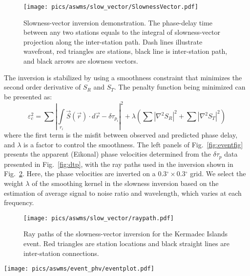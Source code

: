 \begin{figure}
	\center
	\texttt{[image: pics/aswms/slow\_vector/SlownessVector.pdf]}
	\caption[Relative phase delays against the epicentral distance differences]{Slowness-vector inversion demonstration. The phase-delay time between any two stations equals to the integral of slowness-vector projection along the inter-station path. Dash lines illustrate wavefront, red triangles are stations, black line is inter-station path, and black arrows are slowness vectors.}
	\label{fig:slowvector}
\end{figure}

The inversion is stabilized by using a smoothness constraint that minimizes the second order derivative of $S_R$ and $S_T$. The penalty function being minimized can be presented as:
\begin{equation}
	\varepsilon_{c}^2 = \sum \left| \int\limits_{r_i} \vec{S}(\vec{r}) \cdot d\vec{r} - \delta \tau_{p_i}\right|^2 + \lambda \left( \sum |\nabla^2 S_R|^2 + \sum |\nabla^2 S_T|^2 \right)
\end{equation}
where the first term is the misfit between observed and predicted phase delay, and $\lambda$ is a factor to control the smoothness. The left panels of Fig.~\ref{fig:eventfig} presents the apparent (Eikonal) phase velocities determined from the $\delta \tau_p$ data presented in Fig.~\ref{fig:dtp}, with the ray paths used in the inversion shown in Fig.~\ref{fig:raypath}.    
Here, the phase velocities are inverted on a 0.3$^\circ \times$0.3$^\circ$ grid. We select the weight $\lambda$ of the smoothing kernel in the slowness inversion based on the estimation of average signal to noise ratio and wavelength, which varies at each frequency.

\begin{figure}
	\center
	\texttt{[image: pics/aswms/slow\_vector/raypath.pdf]}
	\caption[Ray paths of the slowness-vector inversion for the Kermadec Islands event.]{Ray paths of the slowness-vector inversion for the Kermadec Islands event. Red triangles are station locations and black straight lines are inter-station connections.}
	\label{fig:raypath}
\end{figure}

\begin{figure*}
	\texttt{[image: pics/aswms/event\_phv/eventplot.pdf]}
	\caption[The 40-s Rayleigh-wave results of two different events.]{The 40-s Rayleigh-wave results of two different events. \textbf{a)} The apparent phase-velocity map derived from phase-delay measurements (Fig.~\ref{fig:dtp}) for the Kermadec Islands event. \textbf{b)} The corrected phase-velocity map derived from the apparent phase velocity and amplitude measurements via Helmholtz equation. \textbf{c)} The amplitude map. \textbf{d)} The map of the propagation direction anomalies. Arrows demonstrate the propagation direction while the color map illustrates the angle differing from the great-circle direction. The rotation of the arrows from great-circle direction is exaggerated for demonstration. \textbf{e)}-\textbf{h)} Same as a)-d) but for the April 7, 2009 earthquake near Kuril Islands ($M_s=6.8$).}
	\label{fig:eventfig}
\end{figure*}

